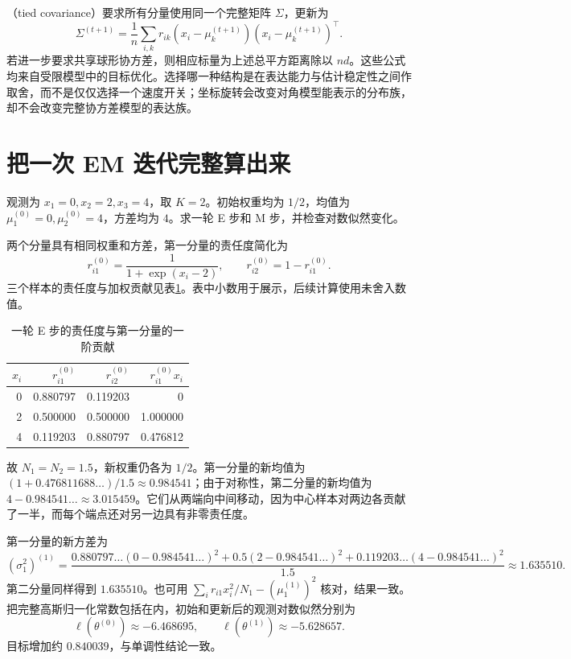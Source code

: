\documentclass[UTF8]{ctexart}
\begin{document}
（tied covariance）要求所有分量使用同一个完整矩阵 $\Sigma$，更新为
\begin{equation}
\Sigma^{(t+1)}=\frac1n\sum_{i,k}r_{ik}
(x_i-\mu_k^{(t+1)})(x_i-\mu_k^{(t+1)})^\top.
\label{eq:gmm-tied-update}
\end{equation}
若进一步要求共享球形协方差，则相应标量为上述总平方距离除以 $nd$。这些公式均来自受限模型中的目标优化。选择哪一种结构是在表达能力与估计稳定性之间作取舍，而不是仅仅选择一个速度开关；坐标旋转会改变对角模型能表示的分布族，却不会改变完整协方差模型的表达族。

\section{把一次 EM 迭代完整算出来}
\label{sec:gmm-numerical-example}

\begin{example}
观测为 $x_1=0,x_2=2,x_3=4$，取 $K=2$。初始权重均为 $1/2$，均值为 $\mu_1^{(0)}=0,\mu_2^{(0)}=4$，方差均为 $4$。求一轮 E 步和 M 步，并检查对数似然变化。
\end{example}
\begin{solve}
两个分量具有相同权重和方差，第一分量的责任度简化为
\[
r_{i1}^{(0)}=\frac{1}{1+\exp(x_i-2)},\qquad r_{i2}^{(0)}=1-r_{i1}^{(0)}.
\]
三个样本的责任度与加权贡献见表\ref{tab:gmm-example}。表中小数用于展示，后续计算使用未舍入数值。
\begin{table}[htbp]
\centering
\caption{一轮 E 步的责任度与第一分量的一阶贡献}
\label{tab:gmm-example}
\begin{tabular}{rrrr}
\toprule
$x_i$ & $r_{i1}^{(0)}$ & $r_{i2}^{(0)}$ & $r_{i1}^{(0)}x_i$\\
\midrule
0 & 0.880797 & 0.119203 & 0\\
2 & 0.500000 & 0.500000 & 1.000000\\
4 & 0.119203 & 0.880797 & 0.476812\\
\bottomrule
\end{tabular}
\end{table}
故 $N_1=N_2=1.5$，新权重仍各为 $1/2$。第一分量的新均值为 $(1+0.476811688\ldots)/1.5\approx0.984541$；由于对称性，第二分量的新均值为 $4-0.984541\ldots\approx3.015459$。它们从两端向中间移动，因为中心样本对两边各贡献了一半，而每个端点还对另一边具有非零责任度。

第一分量的新方差为
\[
(\sigma_1^2)^{(1)}=
\frac{0.880797\ldots(0-0.984541\ldots)^2
+0.5(2-0.984541\ldots)^2
+0.119203\ldots(4-0.984541\ldots)^2}{1.5}
\approx1.635510.
\]
第二分量同样得到 $1.635510$。也可用 $\sum_i r_{i1}x_i^2/N_1-(\mu_1^{(1)})^2$ 核对，结果一致。把完整高斯归一化常数包括在内，初始和更新后的观测对数似然分别为
\[
\ell(\theta^{(0)})\approx-6.468695,
\qquad \ell(\theta^{(1)})\approx-5.628657.
\]
目标增加约 $0.840039$，与单调性结论一致。
\end{solve}
\end{document}
